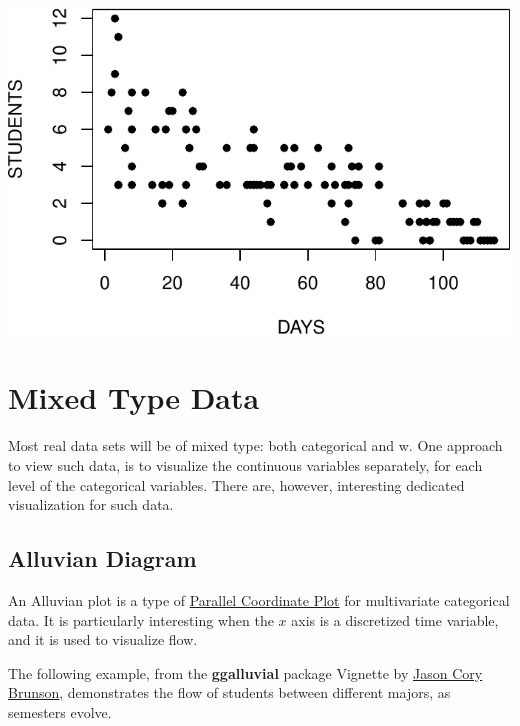 \documentclass[]{book}
\theoremstyle{definition}
\theoremstyle{definition}
\theoremstyle{definition}
\theoremstyle{remark}
\begin{document}
\includegraphics[width=0.5\linewidth]{Rcourse_files/figure-latex/unnamed-chunk-144-1}

\section{Mixed Type Data}\label{mixed-type-data}

Most real data sets will be of mixed type: both categorical and w. One
approach to view such data, is to visualize the continuous variables
separately, for each level of the categorical variables. There are,
however, interesting dedicated visualization for such data.

\subsection{Alluvian Diagram}\label{alluvian}

An Alluvian plot is a type of \protect\hyperlink{parcoord}{Parallel
Coordinate Plot} for multivariate categorical data. It is particularly
interesting when the \(x\) axis is a discretized time variable, and it
is used to visualize flow.

The following example, from the \textbf{ggalluvial} package Vignette by
\href{https://cran.r-project.org/web/packages/ggalluvial/vignettes/ggalluvial.html}{Jason
Cory Brunson}, demonstrates the flow of students between different
majors, as semesters evolve.
\end{document}
